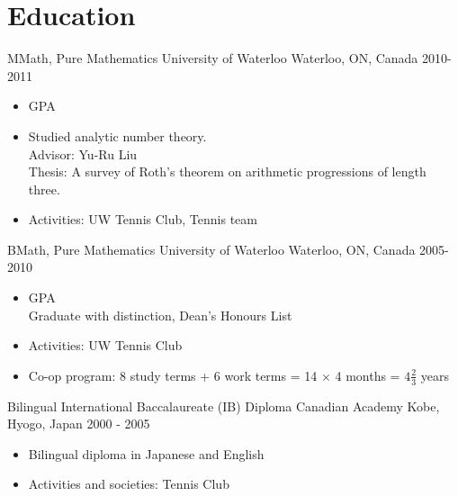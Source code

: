 \section{Education}
\cventry
  {MMath, Pure Mathematics} %
  {University of Waterloo} %
  {Waterloo, ON, Canada} %
  {2010-2011} %
  {
    \begin{itemize} %
      \liststyle
      \item {GPA}
      \item {Studied analytic number theory.\\
        Advisor: Yu-Ru Liu\\
        Thesis: A survey of Roth's theorem on arithmetic progressions of length three.}
      \item {Activities: UW Tennis Club, Tennis team}
    \end{itemize}
  }

\cventry
  {BMath, Pure Mathematics} %
  {University of Waterloo} %
  {Waterloo, ON, Canada} %
  {2005-2010} %
  {
    \begin{itemize} %
      \liststyle
      \item {GPA\\
        Graduate with distinction, Dean's Honours List}
      \item {Activities: UW Tennis Club}
      \item {Co-op program: 8 study terms + 6 work terms = 14 $\times$ 4 months = $4 \frac{2}{3}$ years}
    \end{itemize}
  }

\cventry
  {Bilingual International Baccalaureate (IB) Diploma} %
  {Canadian Academy} %
  {Kobe, Hyogo, Japan} %
  {2000 - 2005} %
  {
    \begin{itemize} %
      \liststyle
      \item {Bilingual diploma in Japanese and English}
      \item {Activities and societies: Tennis Club}
    \end{itemize}
  }

